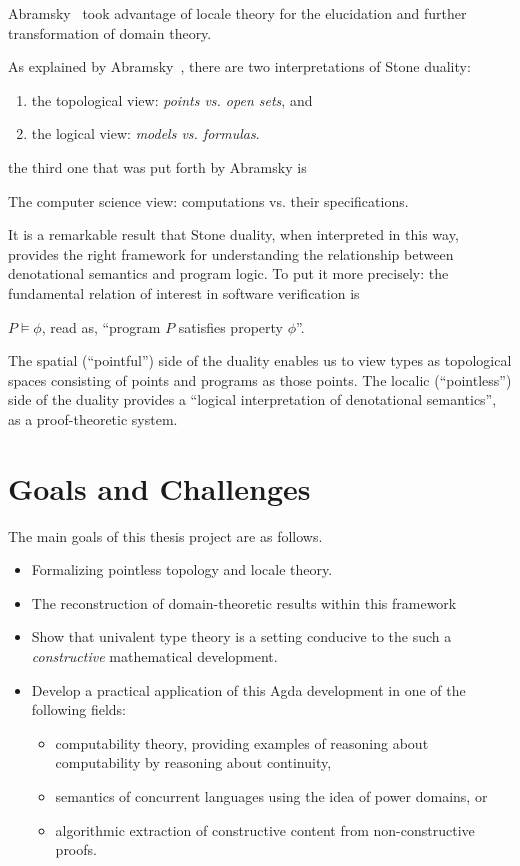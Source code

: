 \documentclass{article}
\begin{document}
Abramsky~\cite{abramsky:1991} took advantage of locale theory for the elucidation and
further transformation of domain theory.

As explained by Abramsky~\cite{abramsky:1991}, there are two interpretations of Stone
duality:
\begin{enumerate}
  \item the topological view: \emph{points vs. open sets}, and
  \item the logical view: \emph{models vs. formulas}.
\end{enumerate}
the third one that was put forth by Abramsky is
\begin{center}
  The computer science view: computations vs. their specifications.
\end{center}

It is a remarkable result that Stone duality, when interpreted in this way, provides the
right framework for understanding the relationship between denotational semantics and
program logic. To put it more precisely: the fundamental relation of interest in software
verification is

\begin{center}
  $P \vDash \phi$, \qquad read as, \qquad ``program $P$ satisfies property $\phi$''.
\end{center}

The spatial (``pointful'') side of the duality enables us to view types as topological
spaces consisting of points and programs as those points. The localic (``pointless'') side
of the duality provides a ``logical interpretation of denotational semantics'', as a
proof-theoretic system.

\section{Goals and Challenges}

The main goals of this thesis project are as follows.

\begin{itemize}
  \item Formalizing pointless topology and locale theory.
  \item The reconstruction of domain-theoretic results within this framework
  \item Show that univalent type theory is a setting conducive to the such a
    \emph{constructive} mathematical development.
  \item Develop a practical application of this Agda development in one of the following fields:
    \begin{itemize}
      \item computability theory, providing examples of reasoning about computability by reasoning
        about continuity,
      \item semantics of concurrent languages using the idea of power domains, or
      \item algorithmic extraction of constructive content from non-constructive proofs.
    \end{itemize}
\end{itemize}
\end{document}
